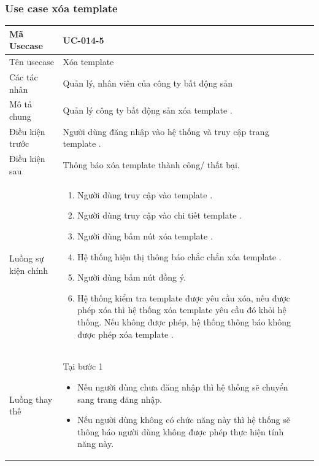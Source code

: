 \documentclass[12pt,a4paper]{article}
\begin{document}
    \subsubsection*{Use case xóa template  }
    \begin{table}[H]
        \centering
        \begin{tabular}{|p{3.5cm}|p{11.5cm}|c|}
            \hline
            Mã Usecase      & UC-014-5                                                       \\
            \hline
            Tên usecase     & Xóa template                                                   \\
            \hline
            Các tác nhân    & Quản lý, nhân viên của công ty bất động sản                    \\
            \hline
            Mô tả chung     & Quản lý công ty bất động sản xóa template .                    \\
            \hline

            Điều kiện trước & Người dùng đăng nhập vào hệ thống và truy cập trang template . \\
            \hline

            Điều kiện sau   & Thông báo xóa template thành công/ thất bại.                   \\
            \hline

            Luồng sự kiện chính & \vspace{-.8cm}\begin{enumerate}
                                                    \item Người dùng truy cập vào template .
                                                    \item Người dùng truy cập vào chi tiết template .
                                                    \item  Người dùng bấm nút xóa template .
                                                    \item  Hệ thống hiện thị thông báo chắc chắn xóa template .
                                                    \item  Người dùng bấm nút đồng ý.
                                                    \item Hệ thống kiểm tra template được yêu cầu xóa, nếu được phép xóa thì hệ thống xóa template yêu cầu đó khỏi hệ thống. Nếu không được phép, hệ thống thông báo không được phép xóa template .
            \end{enumerate}
            \\
            \hline
            Luồng thay thế & Tại bước 1\newline
            \vspace{-.8cm}\begin{itemize}
                              \item Nếu người dùng chưa đăng nhập thì hệ thống sẽ chuyển sang trang đăng nhập.
                              \item Nếu người dùng không có chức năng này thì hệ thống sẽ thông báo người dùng không được phép thực hiện tính năng này.
            \end{itemize}


\end{tabular}
\end{table}
\end{document}
